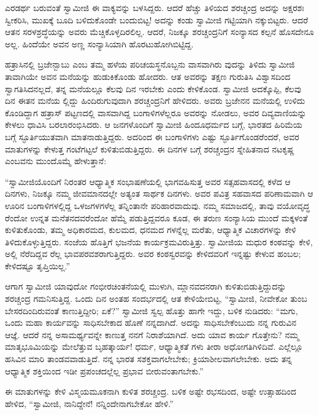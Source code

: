 ಎರಡರ್ಥ ಬರುವಂತೆ ಸ್ವಾಮೀಜಿ ಈ ವಾಕ್ಯವನ್ನು ಬಳಸಿದ್ದರು. ಆದರೆ ಹೆಚ್ಚು ತಿಳಿಯದ ಶರಚ್ಚಂದ್ರ ಅದನ್ನು ಅಕ್ಷರಶಃ ಸ್ವೀಕರಿಸಿ, ಮುಖಕ್ಕೆ ಬೂದಿ ಬಳಿದುಕೊಂಡೇ ಬಂದುಬಿಟ್ಟ! ಅದನ್ನು ಕಂಡು ಸ್ವಾಮೀಜಿ ಗಟ್ಟಿಯಾಗಿ ನಕ್ಕುಬಿಟ್ಟರು. ಆದರೆ ಆತನ ಸರಳಶ್ರದ್ಧೆಯನ್ನು ಅವರು ಮೆಚ್ಚಿಕೊಳ್ಳದಿರಲಿಲ್ಲ. ಆದರೆ, ನಿಜಕ್ಕೂ ಶರಚ್ಚಂದ್ರನಿಗೆ ಸಂನ್ಯಾಸದ ಕಲ್ಪನೆ ಹೊಸದೇನೂ ಅಲ್ಲ. ಹಿಂದೆಯೇ ಅವನ ಅಣ್ಣ ಸಂನ್ಯಾಸಿಯಾಗಿ ಹೊರಟುಹೋಗಿಬಿಟ್ಟಿದ್ದ.

ಹತ್ರಾಸಿನಲ್ಲಿ ಬ್ರಜೇನ್ಬಾಬು ಎಂಬ ತಮ್ಮ ಹಳೆಯ ಪರಿಚಯಸ್ಥನೊಬ್ಬನು ವಾಸವಾಗಿರು ವುದನ್ನು ತಿಳಿದು ಸ್ವಾಮೀಜಿ ತಾವಾಗಿಯೇ ಅವನ ಮನೆಯನ್ನು ಹುಡುಕಿಕೊಂಡು ಹೋದರು. ಆತ ಅವರನ್ನು ತಕ್ಷಣ ಗುರುತಿಸಿ ವಿಶ್ವಾಸದಿಂದ ಸ್ವಾಗತಿಸಿದನಲ್ಲದೆ, ತನ್ನ ಮನೆಯಲ್ಲೂ ಕೆಲವು ದಿನ ಇರಬೇಕು ಎಂದು ಕೇಳಿಕೊಂಡ. ಸ್ವಾಮೀಜಿ ಅದಕ್ಕೊಪ್ಪಿ, ಕೆಲವು ದಿನ ಈತನ ಮನೆಯ ಲ್ಲಿದ್ದು ಹಿಂದಿರುಗುವುದಾಗಿ ಶರಚ್ಚಂದ್ರನಿಗೆ ಹೇಳಿದರು. ಅವರು ಬ್ರಜೇನನ ಮನೆಯಲ್ಲಿ ಉಳಿದು ಕೊಂಡಿದ್ದಾಗ ಹತ್ರಾಸ್ ಪಟ್ಟಣದಲ್ಲಿ ವಾಸವಾಗಿದ್ದ ಬಂಗಾಳಿಗಳೆಲ್ಲರೂ ಅವರನ್ನು ನೋಡಲು, ಅವರ ದಿವ್ಯವಾಣಿಯನ್ನು ಕೇಳಲು ಧಾವಿಸಿ ಬರಲಾರಂಭಿಸಿದರು. ಆ ಜನಗಳೊಂದಿಗೆ ಸ್ವಾಮೀಜಿ ಹಿಂದೂಧರ್ಮದ ಬಗ್ಗೆ, ಭಾರತದ ಹಿರಿಮೆಯ ಬಗ್ಗೆ ಸ್ಫೂರ್ತಿಯುತವಾಗಿ ಮಾತನಾಡುತ್ತಿದ್ದರು. ಅದರಿಂದ ಈ ಬಂಗಾಳಿಗಳು ಎಷ್ಟು ಸ್ಫೂರ್ತಿಗೊಂಡರೆಂದರೆ, ಅವರ ಮಾತುಗಳನ್ನು ಕೇಳುತ್ತ ಗಂಟೆಗಟ್ಟಲೆ ಕುಳಿತುಬಿಡುತ್ತಿದ್ದರು. ಈ ದಿನಗಳ ಬಗ್ಗೆ ಶರಚ್ಚಂದ್ರನ ಸ್ನೇಹಿತನಾದ ನಟಕೃಷ್ಣ ಎಂಬವನು ಮುಂದೊಮ್ಮೆ ಹೇಳುತ್ತಾನೆ:

“ಸ್ವಾಮೀಜಿಯೊಂದಿಗೆ ನಿರಂತರ ಆಧ್ಯಾತ್ಮಿಕ ಸಂಭಾಷಣೆಯಲ್ಲಿ ಭಾಗವಹಿಸುತ್ತ ಅವರ ಸತ್ಸಹವಾಸದಲ್ಲಿ ಕಳೆದ ಆ ದಿನಗಳು, ನಿಜಕ್ಕೂ ನಮ್ಮ ಜೀವಮಾನದಲ್ಲೇ ಅತ್ಯಂತ ಸಾರ್ಥಕ ದಿನಗಳು. ಅವರ ಪವಿತ್ರ ಸಹವಾಸದ ಪರಿಣಾಮವಾಗಿ ಆ ಊರಿನ ಬಂಗಾಳಿಗಳಲ್ಲಿದ್ದ ಒಳಜಗಳಗಳೆಲ್ಲ ತನ್ನಿಂತಾನೇ ಪರಿಹಾರವಾದುವು. ನಮ್ಮ ಸಮಾಜದಲ್ಲಿ, ತಾವು ವಯೋವೃದ್ಧ ರೆಂದೋ ಉನ್ನತ ಮನೆತನದವರೆಂದೋ ಹೆಮ್ಮೆ ಪಡುತ್ತಿದ್ದವರೂ ಕೂಡ, ಈ ತರುಣ ಸಂನ್ಯಾಸಿಯ ಮುಂದೆ ಮಕ್ಕಳಂತೆ ಕುಳಿತುಕೊಂಡು, ತಮ್ಮ ಅಧಿಕಾರಮದ, ಕುಲಮದ, ಧನಮದ ಗಳನ್ನೆಲ್ಲ ಮರೆತು, ಆಧ್ಯಾತ್ಮಿಕ ವಿಚಾರಗಳನ್ನು ಕೇಳಿ ತಿಳಿದುಕೊಳ್ಳುತ್ತಿದ್ದರು. ಸಂಜೆಯ ಹೊತ್ತಿಗೆ ಭಜನೆಯ ಕಾರ್ಯಕ್ರಮವಿರುತ್ತಿತ್ತು. ಸ್ವಾಮೀಜಿಯ ಮಧುರ ಕಂಠವನ್ನು ಕೇಳಿ, ಅಲ್ಲಿ ನೆರೆದಿದ್ದವ ರೆಲ್ಲ ಭಾವಪರವಶರಾಗುತ್ತಿದ್ದರು. ಅವರ ಕಂಠಸ್ವರವನ್ನು ಕೇಳಿದವರಿಗೆ ಇನ್ನಷ್ಟು ಕೇಳುವ ಹಂಬಲ; ಕೇಳಿದಷ್ಟೂ ತೃಪ್ತಿಯಿಲ್ಲ.”

ಆಗಾಗ ಸ್ವಾಮೀಜಿ ಯಾವುದೋ ಗಂಭೀರಚಿಂತನೆಯಲ್ಲಿ ಮುಳುಗಿ, ಮ್ಲಾನವದನರಾಗಿ ಕುಳಿತುಬಿಡುತ್ತಿದ್ದುದನ್ನು ಶರಚ್ಚಂದ್ರ ಗಮನಿಸುತ್ತಿದ್ದ. ಒಂದು ದಿನ ಅಂತಹ ಸಂದರ್ಭದಲ್ಲಿ ಆತ ಕೇಳಿಯೇಬಿಟ್ಟ, “ಸ್ವಾಮೀಜಿ, ನೀವೇಕೋ ತುಂಬ ಬೇಸರದಿಂದಿರುವಂತೆ ಕಾಣುತ್ತಿದ್ದೀರಿ; ಏಕೆ?” ಸ್ವಾಮೀಜಿ ಸ್ವಲ್ಪ ಹೊತ್ತು ಹಾಗೇ ಇದ್ದು, ಬಳಿಕ ನುಡಿದರು: “ಮಗು, ಒಂದು ಮಹಾ ಕಾರ್ಯವನ್ನು ಸಾಧಿಸಬೇಕಾದ ಹೊಣೆ ನನ್ನದಾಗಿದೆ. ಅದನ್ನು ಸಾಧಿಸಬೇಕೆಂಬುದು ನನ್ನ ಗುರುವಿನ ಆಜ್ಞೆ. ಆದರೆ ನನ್ನ ಅಸಾಮರ್ಥ್ಯವನ್ನೇ ಕಾಣುತ್ತ ನನಗೆ ನಿರಾಶೆಯಾಗಿದೆ. ಅದು ಯಾವ ಕಾರ್ಯ ಗೊತ್ತೇನು? ನಮ್ಮ ಮಾತೃಭೂಮಿಯನ್ನು ಮೇಲೆತ್ತುವ ಬೃಹತ್ಕಾರ್ಯ! ಧರ್ಮ, ಆಧ್ಯಾತ್ಮಿಕತೆ ಗಳು ತೀರಾ ಅಧೋಗತಿಗಿಳಿದಿವೆ. ಎಲ್ಲೆಲ್ಲೂ ಹಸಿವಿನ ಮಾರಿ ತಾಂಡವವಾಡುತ್ತಿದೆ. ನನ್ನ ಭಾರತ ಸಶಕ್ತವಾಗಲೇಬೇಕು; ಕ್ರಿಯಾಶೀಲವಾಗಲೇಬೇಕು. ಅದು ತನ್ನ ಆಧ್ಯಾತ್ಮಿಕ ಶಕ್ತಿಯಿಂದ ಇಡೀ ಪ್ರಪಂಚದಲ್ಲೆಲ್ಲ ಪ್ರಭಾವ ಬೀರುವಂತಾಗಬೇಕು.”

ಈ ಮಾತುಗಳನ್ನು ಕೇಳಿ ವಿಸ್ಮಯಮೂಕನಾಗಿ ಕುಳಿತ ಶರಚ್ಚಂದ್ರ. ಬಳಿಕ ಅಷ್ಟೇ ರಭಸದಿಂದ, ಅಷ್ಟೇ ಉತ್ಸಾಹದಿಂದ ಹೇಳಿದ, “ಸ್ವಾಮೀಜಿ, ನಾನಿದ್ದೇನೆ! ನನ್ನಿಂದೇನಾಗಬೇಕೋ ಹೇಳಿ.”

